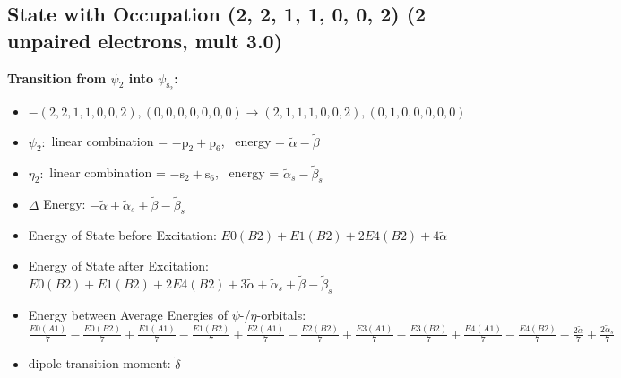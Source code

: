 \documentclass[12pt,a4paper]{article}
\begin{document}
\subsection*{State with Occupation (2, 2, 1, 1, 0, 0, 2) (2 unpaired electrons, mult 3.0)}
        \noindent\textbf{Transition from $\psi_{2}$ into $\psi_{\text{s}_{2}}$:}
        \begin{itemize}
            \item $- (2, 2, 1, 1, 0, 0, 2), (0, 0, 0, 0, 0, 0, 0) \rightarrow (2, 1, 1, 1, 0, 0, 2), (0, 1, 0, 0, 0, 0, 0)$
        
            \item $\psi_{2}:$ linear combination = $- \text{p}_{2} + \text{p}_{6}$, \
            energy = $\tilde{\alpha} - \tilde{\beta}$
            
            \item $\eta_{2}:$ linear combination = $- \text{s}_{2} + \text{s}_{6}$, \
            energy = $\tilde{\alpha}_{s} - \tilde{\beta}_{s}$
            
                \item $\Delta$ Energy: $- \tilde{\alpha} + \tilde{\alpha}_{s} + \tilde{\beta} - \tilde{\beta}_{s}$
                \item Energy of State before Excitation: $E0(B2) + E1(B2) + 2 E4(B2) + 4 \tilde{\alpha}$
                \item Energy of State after Excitation: $E0(B2) + E1(B2) + 2 E4(B2) + 3 \tilde{\alpha} + \tilde{\alpha}_{s} + \tilde{\beta} - \tilde{\beta}_{s}$
                \item Energy between Average Energies of $\psi$-/$\eta$-orbitals: $\frac{E0(A1)}{7} - \frac{E0(B2)}{7} + \frac{E1(A1)}{7} - \frac{E1(B2)}{7} + \frac{E2(A1)}{7} - \frac{E2(B2)}{7} + \frac{E3(A1)}{7} - \frac{E3(B2)}{7} + \frac{E4(A1)}{7} - \frac{E4(B2)}{7} - \frac{2 \tilde{\alpha}}{7} + \frac{2 \tilde{\alpha}_{s}}{7}$
            
            \item dipole transition moment: $\tilde{\delta}$
        
        \end{itemize}
        
\end{document}
